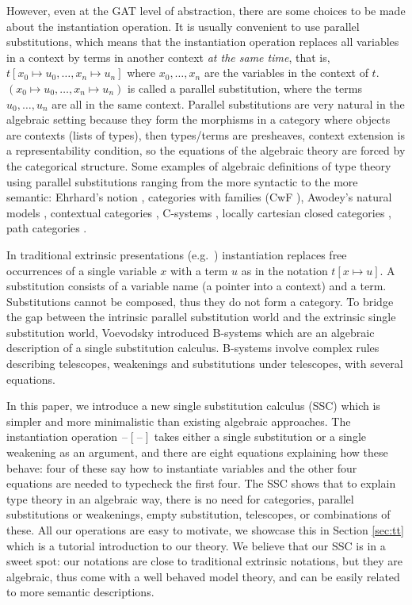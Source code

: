 \documentclass[a4paper,UKenglish]{article}
\newcommand{\blank}{\mathord{\hspace{1pt}\text{--}\hspace{1pt}}} %
\begin{document}
However, even at the GAT level of abstraction, there are some choices
to be made about the instantiation operation. It is usually convenient
to use parallel substitutions, which means that the instantiation
operation replaces all variables in a context by terms in another
context \emph{at the same time}, that is, $t[x_0\mapsto
  u_0,\dots,x_n\mapsto u_n]$ where $x_0,\dots,x_n$ are the variables
in the context of $t$. $(x_0\mapsto u_0,\dots,x_n\mapsto u_n)$ is
called a parallel substitution, where the terms $u_0,\dots,u_n$ are
all in the same context. Parallel substitutions are very natural in
the algebraic setting because they form the morphisms in a category
where objects are contexts (lists of types), then types/terms are
presheaves, context extension is a representability condition, so the
equations of the algebraic theory are forced by the categorical
structure. Some examples of algebraic definitions of type theory using
parallel substitutions ranging from the more syntactic to the more
semantic: Ehrhard's notion \cite{ehrhard,coquandEhrhard}, categories
with families (CwF \cite{DBLP:conf/types/Dybjer95,Castellan2021}),
Awodey's natural models \cite{DBLP:journals/mscs/Awodey18}, contextual
categories \cite{DBLP:journals/apal/Cartmell86}, C-systems
\cite{DBLP:journals/lmcs/AhrensLV18}, locally cartesian closed
categories \cite{DBLP:journals/mscs/ClairambaultD14}, path categories
\cite{10.1145/3204492}.

In traditional extrinsic presentations
(e.g.\ \cite{alti:phd93,DBLP:books/daglib/0005958}) instantiation
replaces free occurrences of a single variable $x$ with a term $u$ as
in the notation $t[x\mapsto u]$. A substitution consists of a
variable name (a pointer into a context) and a term. Substitutions
cannot be composed, thus they do not form a category. To bridge the
gap between the intrinsic parallel substitution world and the
extrinsic single substitution world, Voevodsky introduced B-systems
\cite{AHRENS_EMMENEGGER_NORTH_RIJKE_2023} which are an algebraic
description of a single substitution calculus. B-systems involve
complex rules describing telescopes, weakenings and substitutions
under telescopes, with several equations.

In this paper, we introduce a new single substitution calculus (SSC)
which is simpler and more minimalistic than existing algebraic
approaches. The instantiation operation $\blank[\blank]$ takes either a
single substitution or a single weakening as an argument, and there
are eight equations explaining how these behave: four of these say how
to instantiate variables and the other four equations are needed to
typecheck the first four. The SSC shows that to explain type theory in
an algebraic way, there is no need for categories, parallel
substitutions or weakenings, empty substitution, telescopes, or
combinations of these. All our operations are easy to motivate, we
showcase this in Section \ref{sec:tt} which is a tutorial introduction
to our theory. We believe that our SSC is in a sweet spot: our
notations are close to traditional extrinsic notations, but they are
algebraic, thus come with a well behaved model theory, and can be
easily related to more semantic descriptions.
\end{document}
